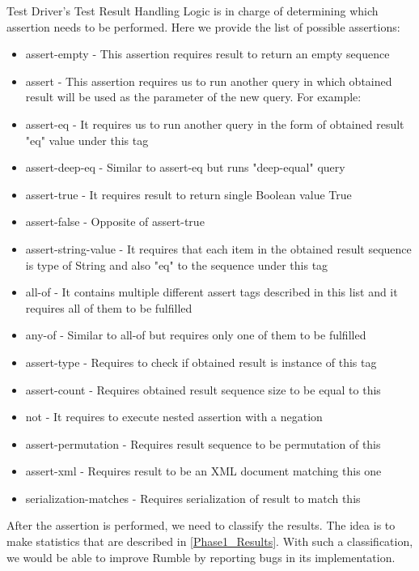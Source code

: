 Test Driver's Test Result Handling Logic is in charge of determining which assertion needs to be performed. Here we provide the list of possible assertions:

\begin{itemize}
	\item assert-empty - This assertion requires result to return an empty sequence
	\item assert - This assertion requires us to run another query in which obtained result will be used as the parameter of the new query. For example:
	
	\item assert-eq - It requires us to run another query in the form of obtained result "eq" value under this tag
	\item assert-deep-eq - Similar to assert-eq but runs "deep-equal" query
	\item assert-true - It requires result to return single Boolean value True
	\item assert-false - Opposite of assert-true
	\item assert-string-value - It requires that each item in the obtained result sequence is type of String and also "eq" to the sequence under this tag
	\item all-of - It contains multiple different assert tags described in this list and it requires all of them to be fulfilled 
	\item any-of - Similar to all-of but requires only one of them to be fulfilled
	\item assert-type - Requires to check if obtained result is instance of this tag
	\item assert-count - Requires obtained result sequence size to be equal to this
	\item not - It requires to execute nested assertion with a negation
	\item assert-permutation - Requires result sequence to be permutation of this
	\item assert-xml - Requires result to be an XML document matching this one
	\item serialization-matches - Requires serialization of result to match this
\end{itemize}

After the assertion is performed, we need to classify the results. The idea is to make statistics that are described in \ref{Phase1_Results}. With such a classification, we would be able to improve Rumble by reporting bugs in its implementation.

